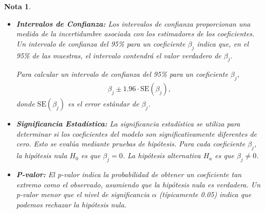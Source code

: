 \documentclass[12pt]{article}
\newtheorem{Note}{Nota}%
\begin{document}
\begin{Note}
\begin{itemize}
\item \textbf{Intervalos de Confianza: } Los intervalos de confianza proporcionan una medida de la incertidumbre asociada con los estimadores de los coeficientes. Un intervalo de confianza del 95\% para un coeficiente $\beta_j$ indica que, en el 95\% de las muestras, el intervalo contendr\'a el valor verdadero de $\beta_j$.

Para calcular un intervalo de confianza del 95\% para un coeficiente $\beta_j$, 
\begin{eqnarray*}
\beta_j \pm 1.96 \cdot \text{SE}(\beta_j),
\end{eqnarray*}
donde $\text{SE}(\beta_j)$ es el error est\'andar de $\beta_j$.

\item \textbf{Significancia Estad\'istica:} La significancia estad\'istica se utiliza para determinar si los coeficientes del modelo son significativamente diferentes de cero. Esto se eval\'ua mediante pruebas de hip\'otesis. Para cada coeficiente $\beta_j$, la hip\'otesis nula $H_0$ es que $\beta_j = 0$. La hip\'otesis alternativa $H_a$ es que $\beta_j \neq 0$.

\item \textbf{P-valor: } El p-valor indica la probabilidad de obtener un coeficiente tan extremo como el observado, asumiendo que la hip\'otesis nula es verdadera. Un p-valor menor que el nivel de significancia $\alpha$ (t\'ipicamente 0.05) indica que podemos rechazar la hip\'otesis nula.
\end{itemize}
\end{Note}
\end{document}
